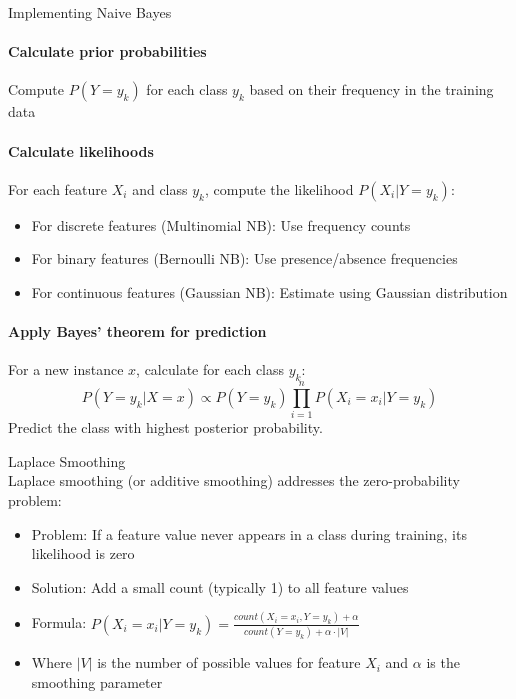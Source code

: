 \begin{KR}{Implementing Naive Bayes}
\paragraph{Calculate prior probabilities}
Compute $P(Y=y_k)$ for each class $y_k$ based on their frequency in the training data

\paragraph{Calculate likelihoods}
For each feature $X_i$ and class $y_k$, compute the likelihood $P(X_i|Y=y_k)$:
\begin{itemize}
    \item For discrete features (Multinomial NB): Use frequency counts
    \item For binary features (Bernoulli NB): Use presence/absence frequencies
    \item For continuous features (Gaussian NB): Estimate using Gaussian distribution
\end{itemize}

\paragraph{Apply Bayes' theorem for prediction}
For a new instance $x$, calculate for each class $y_k$:
\[P(Y=y_k|X=x) \propto P(Y=y_k) \prod_{i=1}^{n} P(X_i=x_i|Y=y_k)\]
Predict the class with highest posterior probability.
\end{KR}



\begin{concept}{Laplace Smoothing}\\
Laplace smoothing (or additive smoothing) addresses the zero-probability problem:
\begin{itemize}
    \item Problem: If a feature value never appears in a class during training, its likelihood is zero
    \item Solution: Add a small count (typically 1) to all feature values
    \item Formula: $P(X_i=x_i|Y=y_k) = \frac{count(X_i=x_i, Y=y_k) + \alpha}{count(Y=y_k) + \alpha \cdot |V|}$
    \item Where $|V|$ is the number of possible values for feature $X_i$ and $\alpha$ is the smoothing parameter
\end{itemize}
\end{concept}


